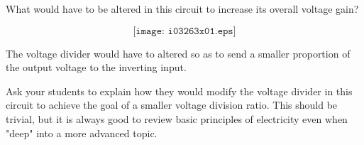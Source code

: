 

What would have to be altered in this circuit to increase its overall voltage gain?

$$\texttt{[image: i03263x01.eps]}$$







The voltage divider would have to altered so as to send a smaller proportion of the output voltage to the inverting input.







Ask your students to explain how they would modify the voltage divider in this circuit to achieve the goal of a smaller voltage division ratio.  This should be trivial, but it is always good to review basic principles of electricity even when "deep" into a more advanced topic.




